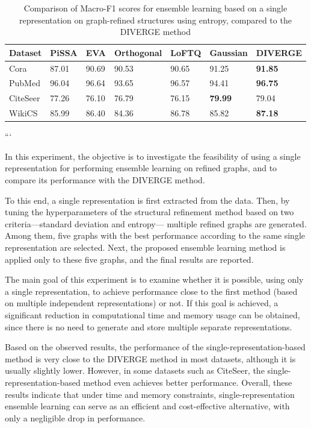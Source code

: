 \documentclass{article}
\begin{document}
\begin{table}[ht]
\centering
\caption{
Comparison of Macro-F1 scores for ensemble learning based on a single representation
on graph-refined structures using entropy,
compared to the DIVERGE method
}
\begin{tabularx}{\linewidth}{l||XXXXXX}
\hline
Dataset & PiSSA & EVA & Orthogonal & LoFTQ & Gaussian & DIVERGE \\ 
\hline
\hline
Cora     & 87.01 & 90.69 & 90.53 & 90.65 & 91.25 & \textbf{91.85} \\ 
PubMed   & 96.04 & 96.64 & 93.65 & 96.57 & 94.41 & \textbf{96.75} \\ 
CiteSeer & 77.26 & 76.10 & 76.79 & 76.15 & \textbf{79.99} & 79.04 \\ 
WikiCS   & 85.99 & 86.40 & 84.36 & 86.78 & 85.82 & \textbf{87.18} \\ 
\hline
\end{tabularx}
\end{table}
```

In this experiment, the objective is to investigate the feasibility of using a single representation
for performing ensemble learning on refined graphs,
and to compare its performance with the DIVERGE method.

To this end, a single representation is first extracted from the data.
Then, by tuning the hyperparameters of the structural refinement method
based on two criteria—standard deviation and entropy—
multiple refined graphs are generated.
Among them, five graphs with the best performance
according to the same single representation are selected.
Next, the proposed ensemble learning method is applied
only to these five graphs,
and the final results are reported.

The main goal of this experiment is to examine whether it is possible,
using only a single representation,
to achieve performance close to the first method
(based on multiple independent representations) or not.
If this goal is achieved,
a significant reduction in computational time and memory usage can be obtained,
since there is no need to generate and store multiple separate representations.

Based on the observed results,
the performance of the single-representation-based method
is very close to the DIVERGE method in most datasets,
although it is usually slightly lower.
However, in some datasets such as CiteSeer,
the single-representation-based method even achieves better performance.
Overall, these results indicate that under time and memory constraints,
single-representation ensemble learning
can serve as an efficient and cost-effective alternative,
with only a negligible drop in performance.
\end{document}
